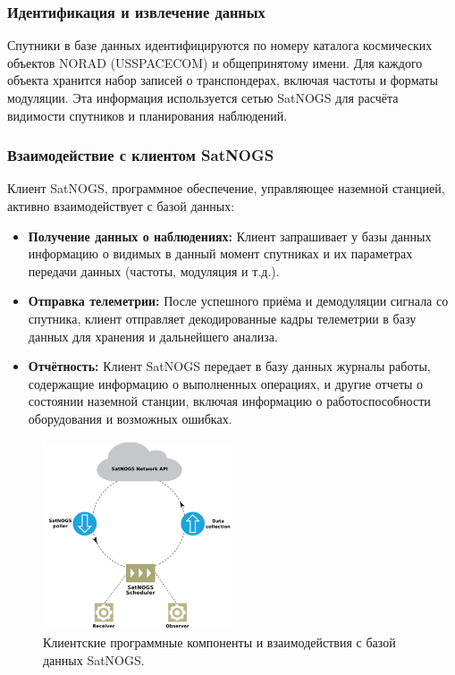 \documentclass[14pt, a4paper]{extreport}
\begin{document}
    \subsubsection{Идентификация и извлечение данных}

    Спутники в базе данных идентифицируются по номеру каталога космических объектов NORAD (USSPACECOM) и общепринятому имени.
    Для каждого объекта хранится набор записей о транспондерах, включая частоты и форматы модуляции.
    Эта информация используется сетью SatNOGS для расчёта видимости спутников и планирования наблюдений.

    \subsubsection{Взаимодействие с клиентом SatNOGS}

    Клиент SatNOGS, программное обеспечение, управляющее наземной станцией, активно взаимодействует с базой данных:

    \begin{itemize}
        \item \textbf{Получение данных о наблюдениях:} Клиент запрашивает у базы данных информацию о видимых в данный момент спутниках и их параметрах передачи данных (частоты, модуляция и т.д.).
        \item \textbf{Отправка телеметрии:} После успешного приёма и демодуляции сигнала со спутника, клиент отправляет декодированные кадры телеметрии в базу данных для хранения и дальнейшего анализа.
        \item \textbf{Отчётность:} Клиент SatNOGS передает в базу данных журналы работы, содержащие информацию о выполненных операциях,  и другие отчеты о состоянии наземной станции, включая информацию о работоспособности оборудования и возможных ошибках.
    \end{itemize}

    \begin{figure}[h!]
        \centering
        \includegraphics[width=0.5\textwidth]{satnogs_client_program_interactions}
        \caption{Клиентские программные компоненты и взаимодействия с базой данных SatNOGS.}
        \label{fig:satnogs_client_program_interactions}
    \end{figure}
\end{document}
